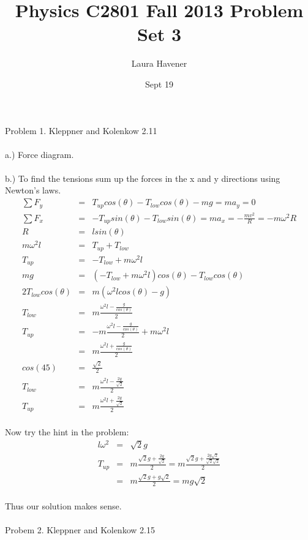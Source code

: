 \documentclass[11pt]{amsart}
\title{Physics C2801 Fall 2013 Problem Set 3}
\author{Laura Havener}
\date{Sept 19} %
\begin{document}
\maketitle

Problem 1. Kleppner and Kolenkow 2.11 \\ \\
a.) Force diagram. \\ \\
b.) To find the tensions sum up the forces in the x and y directions using Newton's laws. \\
\begin{eqnarray*}
\sum{F_{y}} &=& T_{up}cos(\theta)-T_{low}cos(\theta)-mg = ma_{y} = 0 \\
\sum{F_{x}} &=& -T_{up}sin(\theta)-T_{low}sin(\theta) = ma_{x} = -\frac{mv^{2}}{R} =-m\omega^{2}R\\
R &=& lsin(\theta) \\
m\omega^{2}l &=& T_{up}+T_{low} \\
T_{up} &=& -T_{low} +m\omega^{2}l \\
mg &=& (-T_{low} +m\omega^{2}l)cos(\theta) -T_{low}cos(\theta) \\
2T_{low}cos(\theta) &=& m(\omega^{2}lcos(\theta)-g) \\
T_{low} &=& m\frac{\omega^{2}l-\frac{g}{cos(\theta)}}{2} \\
T_{up} &=& - m\frac{\omega^{2}l-\frac{g}{cos(\theta)}}{2} +m\omega^{2}l \\
&=& m\frac{\omega^{2}l+\frac{g}{cos(\theta)}}{2} \\
cos(45) &=& \frac{\sqrt{2}}{2} \\
T_{low} &=& m\frac{\omega^{2}l-\frac{2g}{\sqrt{2}}}{2} \\
T_{up} &=& m\frac{\omega^{2}l+\frac{2g}{\sqrt{2}}}{2}
\end{eqnarray*} \\
Now try the hint in the problem: \\
\begin{eqnarray*}
l\omega^{2} &=& \sqrt{2}g \\
T_{up} &=&  m\frac{\sqrt{2}g+\frac{2g}{\sqrt{2}}}{2} = m\frac{\sqrt{2}g+\frac{2g\sqrt{2}}{\sqrt{2}\sqrt{2}}}{2} \\
&=& m\frac{\sqrt{2}g+g\sqrt{2}}{2} = mg\sqrt{2}
\end{eqnarray*} \\
Thus our solution makes sense. \\ \\
Probem 2. Kleppner and Kolenkow 2.15 \\ \\ 
\end{document}
